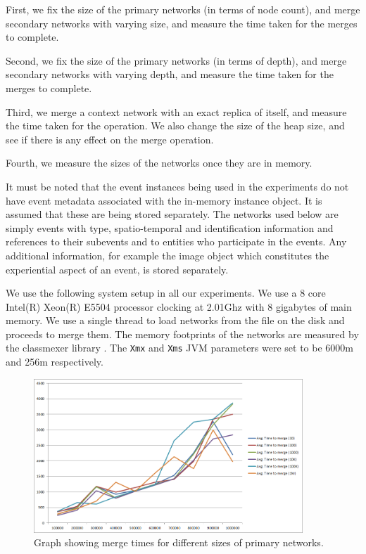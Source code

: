 First, we fix the size of the primary networks (in terms of node count), and merge secondary networks with varying size, and measure the time taken for the merges to complete.

Second, we fix the size of the primary networks (in terms of depth), and merge secondary networks with varying depth, and measure the time taken for the merges to complete.

Third, we merge a context network with an exact replica of itself, and measure the time taken for the operation. We also change the size of the heap size, and see if there is any effect on the merge operation.

Fourth, we measure the sizes of the networks once they are in memory.

It must be noted that the event instances being used in the experiments do not have event metadata associated with the in-memory instance object. It is assumed that these are being stored separately. The networks used below are simply events with type, spatio-temporal and identification information and references to their subevents and to entities who participate in the events. Any additional information, for example the image object which constitutes the experiential aspect of an event, is stored separately.

We use the following system setup in all our experiments. We use a 8 core Intel(R) Xeon(R) E5504 processor clocking at 2.01Ghz with 8 gigabytes of main memory. We use a single thread to load networks from the file on the disk and proceeds to merge them. The memory footprints of the networks are measured by the classmexer library \cite{classmexer}. The \texttt{Xmx} and \texttt{Xms} JVM parameters were set to be 6000m and 256m respectively.

\begin{figure}[t]
\centering
\includegraphics[width=0.9\textwidth]{media/chapter5/perf/mergebignodetest.png}
\caption{Graph showing merge times for different sizes of primary networks.}
\label{fig:agg-merge-tests}
\end{figure}

